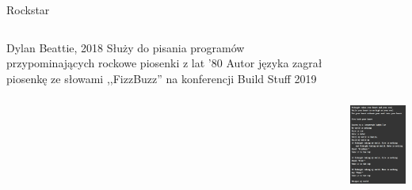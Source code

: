 \begin{frame}{Rockstar}
    \begin{columns}

		\begin{column}{.5\hsize}
			\begin{itemize}
				\myitem Dylan Beattie, 2018
				\myitem Służy do pisania programów przypominających rockowe piosenki z lat '80
				\myitem Autor języka zagrał piosenkę ze słowami ,,FizzBuzz'' na konferencji Build Stuff 2019
			\end{itemize}
		\end{column}

        \begin{column}{.5\hsize}
			\includegraphics[height=7cm]{figures/rockstar.png}
		\end{column}

	\end{columns}
\end{frame}
